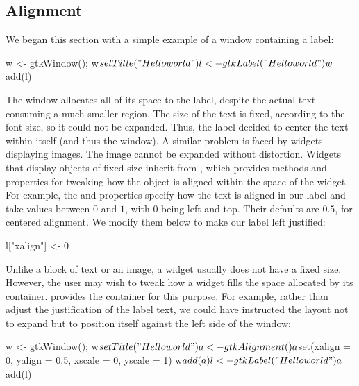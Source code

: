 \subsection{Alignment}
\label{sec:RGtk2:layout:align}

We began this section with a simple example of a window containing a
label:
\begin{Schunk}
\begin{Sinput}
 w <- gtkWindow(); w$setTitle("Hello world")
 l <- gtkLabel("Hello world")
 w$add(l)
\end{Sinput}
\end{Schunk}
%
The window allocates all of its space to the label, despite the actual
text consuming a much smaller region. The size of the text is fixed,
according to the font size, so it could not be expanded. Thus, the
label decided to center the text within itself (and thus the
window). A similar problem is faced by widgets displaying images. The
image cannot be expanded without distortion. Widgets that display
objects of fixed size inherit from , which provides
methods and properties for tweaking how the object is aligned within
the space of the widget. For example, the  and
 properties specify how the text is aligned in our label
and take values between $0$ and $1$, with $0$ being left and
top. Their defaults are $0.5$, for centered alignment. We modify them
below to make our label left justified:
\begin{Schunk}
\begin{Sinput}
 l["xalign"] <- 0
\end{Sinput}
\end{Schunk}

Unlike a block of text or an image, a widget usually does not have a
fixed size. However, the user may wish to tweak how a widget fills
the space allocated by its container.  \GTK\/ provides the
 container for this purpose. For example, rather
than adjust the justification of the label text, we could have
instructed the layout not to expand but to position itself against the
left side of the window:
\begin{Schunk}
\begin{Sinput}
 w <- gtkWindow(); w$setTitle("Hello world")
 a <- gtkAlignment()
 a$set(xalign = 0, yalign = 0.5, xscale = 0, yscale = 1)
 w$add(a)
 l <- gtkLabel("Hello world")
 a$add(l)
\end{Sinput}
\end{Schunk}

